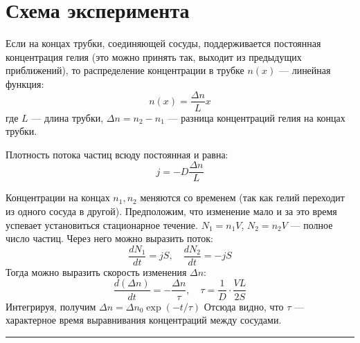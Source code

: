 \documentclass[a4paper,12pt]{report}
\begin{document}
    \section{Схема эксперимента}
    \begin{multicols}{2}
        Если на концах трубки, соединяющей сосуды, поддерживается постоянная концентрация гелия (это можно принять так, выходит из предыдущих приближений), то распределение концентрации в трубке $n(x)$ --- линейная функция:
        \begin{equation}
            n(x)=\frac{\Delta n}{L}x
        \end{equation}
        где $L$ --- длина трубки, $\Delta n = n_2-n_1$ --- разница концентраций гелия на концах трубки.

        Плотность потока частиц всюду постоянная и равна:
        \begin{equation}
            j=-D\frac{\Delta n}{L}
        \end{equation}

        Концентрации на концах $n_1,n_2$ меняются со временем (так как гелий переходит из одного сосуда в другой). Предположим, что изменение мало и за это время успевает установиться стационарное течение. $N_1=n_1V$, $N_2=n_2V$ --- полное число частиц. Через него можно выразить поток:
        \begin{equation}
            \frac{dN_1}{dt}=jS, \quad \frac{dN_2}{dt}=-jS
        \end{equation}
        Тогда можно выразить скорость изменения $\Delta n$:
        \begin{equation}
            \frac{d(\Delta n)}{dt}=-\frac{\Delta n}{\tau}, \quad \tau=\frac{1}{D}\cdot\frac{VL}{2S}
        \end{equation}
        Интегрируя, получим $\Delta n = \Delta n_0 \exp{(-t/\tau)}$
        Отсюда видно, что $\tau$ --- характерное время выравнивания концентраций между сосудами.
    \end{multicols}
    \vspace{1cm}
    \hrule
\end{document}
